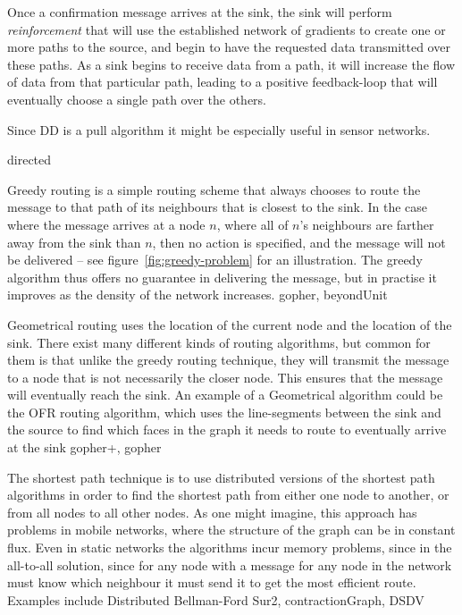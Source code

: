 \documentclass[letter, 12pt, english, draft]{article}
\begin{document}
\begin{description}
{Once a confirmation message arrives at the sink, the sink will perform \emph{reinforcement} that will use the established network of gradients to create one or more paths to the source, and begin to have the requested data transmitted over these paths. As a sink begins to receive data from a path, it will increase the flow of data from that particular path, leading to a positive feedback-loop that will eventually choose a single path over the others.

Since DD is a pull algorithm it might be especially useful in sensor networks.}
{directed}


{Greedy routing is a simple routing scheme that always chooses to route the message to that path of its neighbours that is closest to the sink. In the case where the message arrives at a node $n$, where all of $n$'s neighbours are farther away from the sink than $n$, then no action is specified, and the message will not be delivered -- see figure~\ref{fig:greedy-problem} for an illustration. The greedy algorithm thus offers no guarantee in delivering the message, but in practise it improves as the density of the network increases.}
{gopher, beyondUnit}

{Geometrical routing uses the location of the current node and the location of the sink. There exist many different kinds of routing algorithms, but common for them is that unlike the greedy routing technique, they will transmit the message to a node that is not necessarily the closer node. This ensures that the message will eventually reach the sink. An example of a Geometrical algorithm could be the OFR \cite{gopher} routing algorithm, which uses the line-segments between the sink and the source to find which faces in the graph it needs to route to eventually arrive at the sink}
{gopher+, gopher}

      {The shortest path technique is to use distributed versions of the shortest path algorithms in order to find the shortest path from either one node to another, or from all nodes to all other nodes. As one might imagine, this approach has problems in mobile networks, where the structure of the graph can be in constant flux. Even in static networks the algorithms incur memory problems, since in the all-to-all solution, since for any node with a message for any node in the network must know which neighbour it must send it to get the most efficient route. Examples include Distributed Bellman-Ford}
{Sur2, contractionGraph, DSDV}

\end{description}
\end{document}
